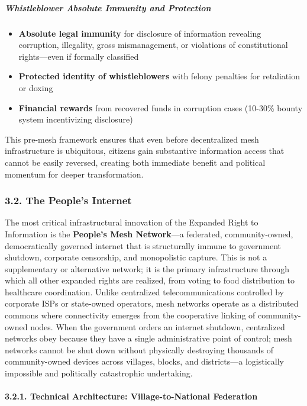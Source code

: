 \subparagraph{Whistleblower Absolute Immunity and
Protection}\label{whistleblower-absolute-immunity-and-protection}

\begin{itemize}
\tightlist
\item
  \textbf{Absolute legal immunity} for disclosure of information
  revealing corruption, illegality, gross mismanagement, or violations
  of constitutional rights---even if formally classified
\item
  \textbf{Protected identity of whistleblowers} with felony penalties
  for retaliation or doxing
\item
  \textbf{Financial rewards} from recovered funds in corruption cases
  (10-30\% bounty system incentivizing disclosure)
\end{itemize}

This pre-mesh framework ensures that even before decentralized mesh
infrastructure is ubiquitous, citizens gain substantive information
access that cannot be easily reversed, creating both immediate benefit
and political momentum for deeper transformation.

\subsubsection{3.2. The People's Internet}\label{the-peoples-internet}

The most critical infrastructural innovation of the Expanded Right to
Information is the \textbf{People's Mesh Network}---a federated,
community-owned, democratically governed internet that is structurally
immune to government shutdown, corporate censorship, and monopolistic
capture. This is not a supplementary or alternative network; it is the
primary infrastructure through which all other expanded rights are
realized, from voting to food distribution to healthcare coordination.
Unlike centralized telecommunications controlled by corporate ISPs or
state-owned operators, mesh networks operate as a distributed commons
where connectivity emerges from the cooperative linking of
community-owned nodes. When the government orders an internet shutdown,
centralized networks obey because they have a single administrative
point of control; mesh networks cannot be shut down without physically
destroying thousands of community-owned devices across villages, blocks,
and districts---a logistically impossible and politically catastrophic
undertaking.

\paragraph{3.2.1. Technical Architecture: Village-to-National
Federation}\label{technical-architecture-village-to-national-federation}


